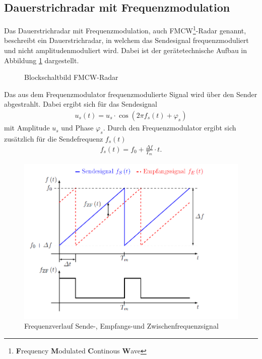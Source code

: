 \subsection{Dauerstrichradar mit Frequenzmodulation}
Das Dauerstrichradar mit Frequenzmodulation, auch FMCW\footnote{\textbf{F}requency \textbf{M}odulated \textbf{C}ontinous \textbf{W}ave}-Radar genannt, beschreibt ein Dauerstrichradar, in welchem das Sendesignal frequenzmoduliert und nicht amplitudenmoduliert wird. Dabei ist der gerätetechnische Aufbau in Abbildung \ref{fig:FMCWRadar} dargestellt. 
\begin{figure}[tbp]
  \centering
  
  \caption{Blockschaltbild FMCW-Radar}
  \label{fig:FMCWRadar}
\end{figure}
Das aus dem Frequenzmodulator frequenzmodulierte Signal wird über den Sender abgestrahlt. Dabei ergibt sich für das Sendesignal
\begin{align}
u_{s}(t) = u_{s} \cdot \cos\left( 2\pi f_{s}(t) + \varphi_{s} \right) 
\end{align}     
mit Amplitude $u_{s}$ und Phase $\varphi_{s}$. Durch den Frequenzmodulator ergibt sich zusätzlich für die Sendefrequenz $f_{s}(t)$
\begin{align}
f_{s}(t) = f_{0} + \frac{\Delta f}{T_{m}}\cdot t.
\end{align}
\begin{figure}[tbp]
  \centering
  \includegraphics[scale=0.7]{gfx/RadarPHuegler.png}
  \caption{Frequenzverlauf Sende-,  Empfangs-und Zwischenfrequenzsignal\cite[S.6]{Huegler}\cite[S.78]{HuderRadar}}
  \label{fig:FMCW_Frequenz}
\end{figure}

